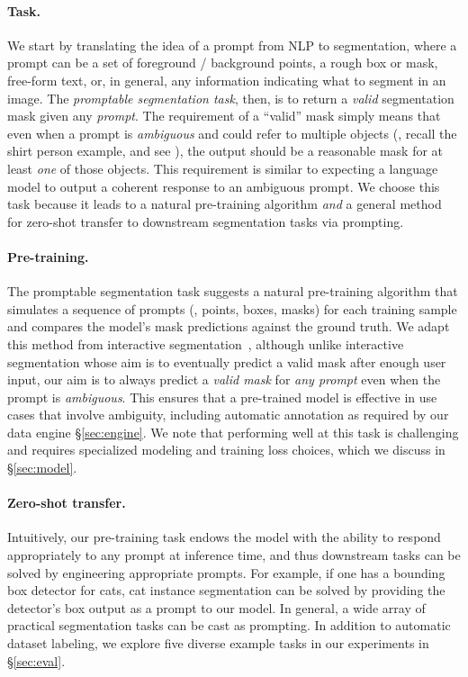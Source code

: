\paragraph{Task.} We start by translating the idea of a prompt from NLP to segmentation, where a prompt can be a set of foreground / background points, a rough box or mask, free-form text, or, in general, any information indicating what to segment in an image. The \emph{promptable segmentation task}, then, is to return a \emph{valid} segmentation mask given any \emph{prompt}. The requirement of a ``valid'' mask simply means that even when a prompt is \emph{ambiguous} and could refer to multiple objects (\eg, recall the shirt \vs person example, and see ), the output should be a reasonable mask for at least \emph{one} of those objects. This requirement is similar to expecting a language model to output a coherent response to an ambiguous prompt. We choose this task because it leads to a natural pre-training algorithm \emph{and} a general method for zero-shot transfer to downstream segmentation tasks via prompting.

\paragraph{Pre-training.} The promptable segmentation task suggests a natural pre-training algorithm that simulates a sequence of prompts (\eg, points, boxes, masks) for each training sample and compares the model's mask predictions against the ground truth. We adapt this method from interactive segmentation~\cite{xu2016deep,mahadevan2018iteratively}, although unlike interactive segmentation whose aim is to eventually predict a valid mask after enough user input, our aim is to always predict a \emph{valid mask} for \emph{any prompt} even when the prompt is \emph{ambiguous}. This ensures that a pre-trained model is effective in use cases that involve ambiguity, including automatic annotation as required by our data engine \S\ref{sec:engine}. We note that performing well at this task is challenging and requires specialized modeling and training loss choices, which we discuss in \S\ref{sec:model}.

\paragraph{Zero-shot transfer.} Intuitively, our pre-training task endows the model with the ability to respond appropriately to any prompt at inference time, and thus downstream tasks can be solved by engineering appropriate prompts. For example, if one has a bounding box detector for cats, cat instance segmentation can be solved by providing the detector's box output as a prompt to our model. In general, a wide array of practical segmentation tasks can be cast as prompting. In addition to automatic dataset labeling, we explore five diverse example tasks in our experiments in \S\ref{sec:eval}.

